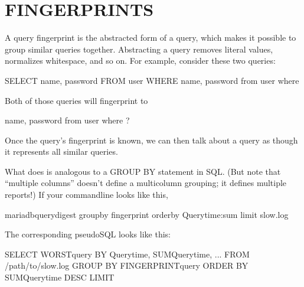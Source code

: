 \documentclass[letterpaper,10pt,english]{sphinxmanual}
\begin{document}
\section{FINGERPRINTS}
\label{\detokenize{mariadb-query-digest:fingerprints}}
\sphinxAtStartPar
A query fingerprint is the abstracted form of a query, which makes it possible
to group similar queries together.  Abstracting a query removes literal values,
normalizes whitespace, and so on.  For example, consider these two queries:

\begin{sphinxVerbatim}[commandchars=\\\{\}]
SELECT name, password FROM user WHERE 
 name,   password from user
   where 
\end{sphinxVerbatim}

\sphinxAtStartPar
Both of those queries will fingerprint to

\begin{sphinxVerbatim}[commandchars=\\\{\}]
 name, password from user where ?
\end{sphinxVerbatim}

\sphinxAtStartPar
Once the query’s fingerprint is known, we can then talk about a query as though
it represents all similar queries.

\sphinxAtStartPar
What  does is analogous to a GROUP BY statement in SQL.  (But
note that “multiple columns” doesn’t define a multi\sphinxhyphen{}column grouping; it defines
multiple reports!) If your command\sphinxhyphen{}line looks like this,

\begin{sphinxVerbatim}[commandchars=\\\{\}]
mariadb\PYGZhy{}query\PYGZhy{}digest               
    \PYGZhy{}\PYGZhy{}group\PYGZhy{}by fingerprint    
    \PYGZhy{}\PYGZhy{}order\PYGZhy{}by Query\PYGZus{}time:sum 
    \PYGZhy{}\PYGZhy{}limit                 
    slow.log
\end{sphinxVerbatim}

\sphinxAtStartPar
The corresponding pseudo\sphinxhyphen{}SQL looks like this:

\begin{sphinxVerbatim}[commandchars=\\\{\}]
SELECT WORSTquery BY Query\PYGZus{}time, SUMQuery\PYGZus{}time, ...
FROM /path/to/slow.log
GROUP BY FINGERPRINTquery
ORDER BY SUMQuery\PYGZus{}time DESC
LIMIT 
\end{sphinxVerbatim}
\end{document}

